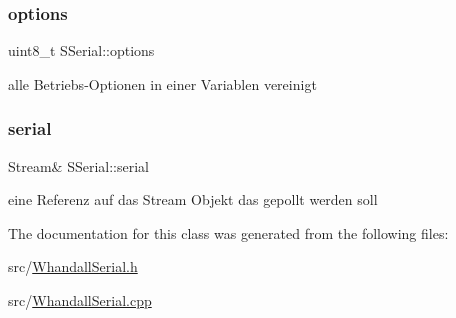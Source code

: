 \subsubsection{\texorpdfstring{options}{options}}
{\footnotesize\ttfamily uint8\+\_\+t S\+Serial\+::options\hspace{0.3cm}{\ttfamily [protected]}}



alle Betriebs-\/\+Optionen in einer Variablen vereinigt 

\mbox{\label{class_s_serial_af44a40fe24625e4e17194246271e0598}} 
\subsubsection{\texorpdfstring{serial}{serial}}
{\footnotesize\ttfamily Stream\& S\+Serial\+::serial\hspace{0.3cm}{\ttfamily [protected]}}



eine Referenz auf das Stream Objekt das gepollt werden soll 



The documentation for this class was generated from the following files\+:\begin{DoxyCompactItemize}
\item 
src/\hyperlink{_whandall_serial_8h}{Whandall\+Serial.\+h}\item 
src/\hyperlink{_whandall_serial_8cpp}{Whandall\+Serial.\+cpp}\end{DoxyCompactItemize}
